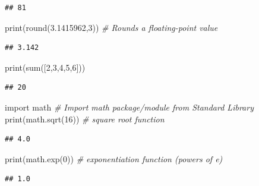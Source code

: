 \documentclass[]{book}
\newenvironment{Shaded}{\begin{snugshade}}{\end{snugshade}}
\newcommand{\DecValTok}[1]{\textcolor[rgb]{0.00,0.00,0.81}{#1}}
\newcommand{\FloatTok}[1]{\textcolor[rgb]{0.00,0.00,0.81}{#1}}
\newcommand{\ImportTok}[1]{#1}
\newcommand{\CommentTok}[1]{\textcolor[rgb]{0.56,0.35,0.01}{\textit{#1}}}
\newcommand{\BuiltInTok}[1]{#1}
\newcommand{\NormalTok}[1]{#1}
\theoremstyle{definition}
\theoremstyle{definition}
\theoremstyle{definition}
\theoremstyle{remark}
\begin{document}
\begin{verbatim}
## 81
\end{verbatim}

\begin{Shaded}
\begin{Highlighting}[]
\BuiltInTok{print}\NormalTok{(}\BuiltInTok{round}\NormalTok{(}\FloatTok{3.1415962}\NormalTok{,}\DecValTok{3}\NormalTok{))         }\CommentTok{# Rounds a floating-point value}
\end{Highlighting}
\end{Shaded}

\begin{verbatim}
## 3.142
\end{verbatim}

\begin{Shaded}
\begin{Highlighting}[]
\BuiltInTok{print}\NormalTok{(}\BuiltInTok{sum}\NormalTok{([}\DecValTok{2}\NormalTok{,}\DecValTok{3}\NormalTok{,}\DecValTok{4}\NormalTok{,}\DecValTok{5}\NormalTok{,}\DecValTok{6}\NormalTok{]))       }
\end{Highlighting}
\end{Shaded}

\begin{verbatim}
## 20
\end{verbatim}

\begin{Shaded}
\begin{Highlighting}[]
\ImportTok{import}\NormalTok{ math                     }\CommentTok{# Import math package/module from Standard Library}
\BuiltInTok{print}\NormalTok{(math.sqrt(}\DecValTok{16}\NormalTok{))            }\CommentTok{# square root function}
\end{Highlighting}
\end{Shaded}

\begin{verbatim}
## 4.0
\end{verbatim}

\begin{Shaded}
\begin{Highlighting}[]
\BuiltInTok{print}\NormalTok{(math.exp(}\DecValTok{0}\NormalTok{))              }\CommentTok{# exponentiation function (powers of e)}
\end{Highlighting}
\end{Shaded}

\begin{verbatim}
## 1.0
\end{verbatim}
\end{document}
